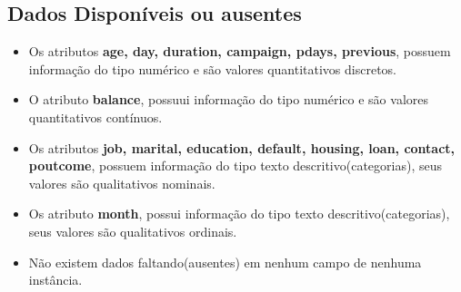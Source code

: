 \documentclass[conference]{IEEEtran}
\begin{document}
\subsection{Dados Disponíveis ou ausentes}
\begin{itemize}
	\item 	Os atributos \textbf{age, day, duration, campaign, pdays, previous}, possuem informação do tipo numérico e são valores quantitativos discretos.
	\item 	O atributo \textbf{balance}, possuui informação do tipo numérico e são valores quantitativos contínuos.
	\item 	Os atributos \textbf{job, marital, education, default, housing, loan, contact, poutcome}, possuem informação do tipo texto descritivo(categorias), seus valores são qualitativos nominais.
	\item 	Os atributo \textbf{month}, possui informação do tipo texto descritivo(categorias), seus valores são qualitativos ordinais.
	\item Não existem dados faltando(ausentes) em nenhum campo de nenhuma instância.
\end{itemize}
\end{document}
